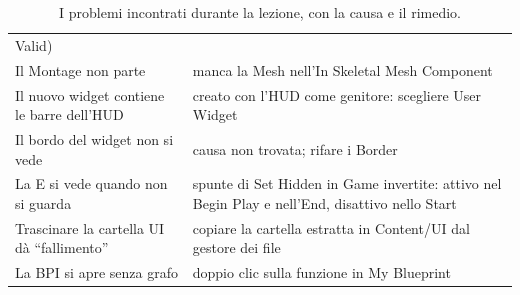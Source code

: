 \begin{table}[htbp]
\begin{tabular}{@{}p{5.4cm}p{8.6cm}@{}}
Valid) \\
Il Montage non parte & manca la Mesh nell'In Skeletal Mesh Component \\
Il nuovo widget contiene le barre dell'HUD & creato con l'HUD come genitore: scegliere User
Widget \\
Il bordo del widget non si vede & causa non trovata; rifare i Border \\
La E si vede quando non si guarda & spunte di Set Hidden in Game invertite: attivo nel
Begin Play e nell'End, disattivo nello Start \\
Trascinare la cartella UI dà ``fallimento'' & copiare la cartella estratta in Content/UI dal
gestore dei file \\
La BPI si apre senza grafo & doppio clic sulla funzione in My Blueprint \\
\bottomrule
\end{tabular}
\caption{I problemi incontrati durante la lezione, con la causa e il rimedio.}
\label{ue12:tab:errori}
\end{table}

